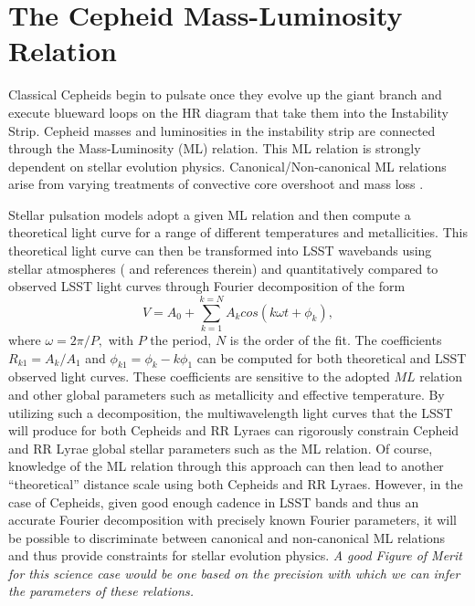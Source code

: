 %
%
%

\section{The Cepheid Mass-Luminosity Relation}
\def\secname{cepheids}\label{sec:\secname}

Classical Cepheids begin to pulsate once they evolve up the giant branch and
execute blueward loops on the HR diagram that take them into the Instability
Strip. Cepheid masses and luminosities in the instability strip are connected
through the Mass-Luminosity (ML) relation.  This ML relation is strongly
dependent on stellar evolution physics. Canonical/Non-canonical ML relations
arise from varying treatments of convective core overshoot and mass loss
\citep{1992A&A...258..397B,2000ApJ...529..293B,2013ApJ...768L...6M}.

Stellar pulsation models adopt a given ML relation and then compute a
theoretical light curve for a range of different temperatures and
metallicities. This theoretical light curve can then be transformed into LSST
wavebands using stellar atmospheres (\citep{Bono2000} and references therein) and
quantitatively compared to observed LSST light curves through Fourier
decomposition of the form
$$V = A_0 + \sum_{k=1}^{k=N}A_k cos(k\omega t + {\phi}_k),$$
where $\omega = 2\pi/P,$ with $P$ the period, $N$ is the order of the fit. The
coefficients $R_{k1}=A_k/A_1$ and ${\phi}_{k1}={\phi}_k - k{\phi}_1$ can be
computed for both theoretical and LSST observed light curves. These
coefficients are sensitive to the adopted $ML$ relation and other global
parameters such as metallicity and effective temperature.  By utilizing such a
decomposition, the multiwavelength light curves that the LSST will produce for
both Cepheids and RR Lyraes can rigorously constrain Cepheid and RR Lyrae
global stellar parameters such as the ML relation. Of course, knowledge of the
ML relation through this approach can then lead to another ``theoretical''
distance scale using both Cepheids and RR Lyraes.  However, in the case of
Cepheids, given good enough cadence in LSST bands and thus an accurate Fourier
decomposition with precisely known Fourier parameters, it will be possible to
discriminate between canonical and non-canonical ML relations and thus provide
constraints for stellar evolution physics. {\it A good Figure of Merit for
this science case would be one based on the precision with which
we can infer the parameters of these relations.}   

